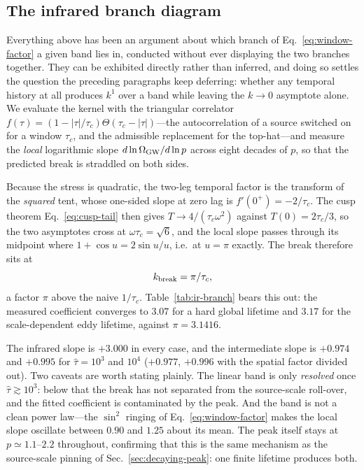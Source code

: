 \documentclass[10pt,prd,aps,nobibnotes,superscriptaddress,preprintnumbers,notitlepage]{revtex4-1}
\newcommand{\add}[1]{{\color{red}#1}}
\newcommand{\add}[1]{#1}
\begin{document}
\add{\subsection{The infrared branch diagram}
\label{sec:ir-branch}

Everything above has been an argument about which branch of
Eq.~\eqref{eq:window-factor} a given band lies in, conducted without ever displaying
the two branches together. They can be exhibited directly rather than inferred, and
doing so settles the question the preceding paragraphs keep deferring: whether any
temporal history at all produces $k^{1}$ over a band while leaving the $k\to0$
asymptote alone. We evaluate the
kernel with the triangular correlator
$f(\tau)=(1-|\tau|/\tau_c)\Theta(\tau_c-|\tau|)$---the autocorrelation of a source
switched on for a window $\tau_c$, and the admissible replacement for the top-hat---and
measure the \emph{local} logarithmic slope $d\ln\Omega_{\rm GW}/d\ln p$ across eight
decades of $p$, so that the predicted break is straddled on both sides.

Because the stress is quadratic, the two-leg temporal factor is the transform of the
\emph{squared} tent, whose one-sided slope at zero lag is $f'(0^{+})=-2/\tau_c$. The
cusp theorem Eq.~\eqref{eq:cusp-tail} then gives $T\to4/(\tau_c\omega^{2})$ against
$T(0)=2\tau_c/3$, so the two asymptotes cross at $\omega\tau_c=\sqrt{6}$, and the local
slope passes through its midpoint where $1+\cos u=2\sin u/u$, i.e.\ at $u=\pi$ exactly.
The break therefore sits at
\begin{equation}
  k_{\rm break}=\pi/\tau_c,
  \label{eq:k-break-pi}
\end{equation}
a factor $\pi$ above the naive $1/\tau_c$. Table~\ref{tab:ir-branch} bears this out:
the measured coefficient converges to $3.07$ for a hard global lifetime and $3.17$ for
the scale-dependent eddy lifetime, against $\pi=3.1416$.

The infrared slope is $+3.000$ in every case, and the intermediate slope is $+0.974$ and
$+0.995$ for $\hat\tau=10^{3}$ and $10^{4}$ ($+0.977$, $+0.996$ with the spatial factor
divided out). Two caveats are worth stating plainly. The linear band is only
\emph{resolved} once $\hat\tau\gtrsim10^{3}$: below that the break has not separated
from the source-scale roll-over, and the fitted coefficient is contaminated by the peak.
And the band is not a clean power law---the $\sin^{2}$ ringing of
Eq.~\eqref{eq:window-factor} makes the local slope oscillate between $0.90$ and $1.25$
about its mean. The peak itself stays at $p\simeq1.1$--$2.2$ throughout, confirming that
this is the same mechanism as the source-scale pinning of
Sec.~\ref{sec:decaying-peak}: one finite lifetime produces both.

}
\end{document}
